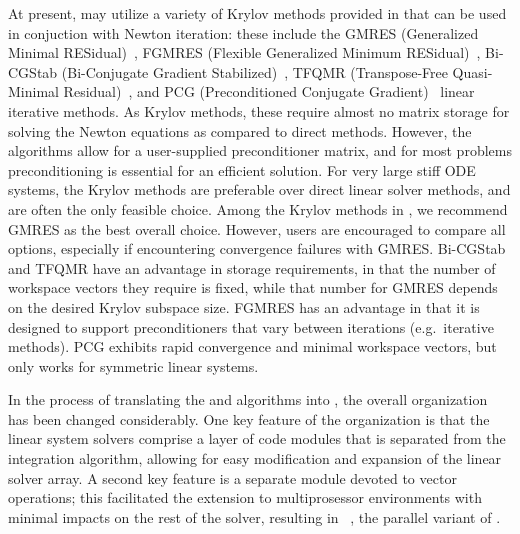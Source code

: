 At present, {\cvode} may utilize a variety of Krylov methods provided
in {\sundials} that can be used in conjuction with Newton iteration:
these include the GMRES (Generalized Minimal RESidual)~\cite{SaSc:86},
FGMRES (Flexible Generalized Minimum RESidual)~\cite{Saa:93},
Bi-CGStab (Bi-Conjugate Gradient Stabilized)~\cite{Van:92}, TFQMR
(Transpose-Free Quasi-Minimal Residual)~\cite{Fre:93}, and PCG
(Preconditioned Conjugate Gradient)~\cite{HeSt:52} linear iterative
methods.  As Krylov methods, these require almost no  
matrix storage for solving the Newton equations as compared to direct 
methods. However, the algorithms allow for a user-supplied preconditioner
matrix, and for most problems preconditioning is essential for an
efficient solution.
For very large stiff ODE systems, the Krylov methods are preferable over
direct linear solver methods, and are often the only feasible choice.
Among the Krylov methods in {\sundials}, we recommend GMRES as the
best overall choice.  However, users are encouraged to compare all
options, especially if encountering convergence failures with GMRES.
Bi-CGStab and TFQMR have an advantage in storage requirements, in
that the number of workspace vectors they require is fixed, while that
number for GMRES depends on the desired Krylov subspace size.  FGMRES
has an advantage in that it is designed to support preconditioners
that vary between iterations (e.g.~iterative methods).  PCG exhibits
rapid convergence and minimal workspace vectors, but only works for
symmetric linear systems.

In the process of translating the {\vode} and {\vodpk} algorithms into
{\CC}, the overall {\cvode} organization has been changed considerably.
One key feature of the {\cvode} organization is that the linear system
solvers comprise a layer of code modules that is separated from the
integration algorithm, allowing for easy modification and expansion of
the linear solver array.  A second key feature is a separate module
devoted to vector operations; this facilitated the extension to
multiprosessor environments with minimal impacts on the rest of the
solver, resulting in {\pvode}~\cite{ByHi:99},
the parallel variant of {\cvode}.  

